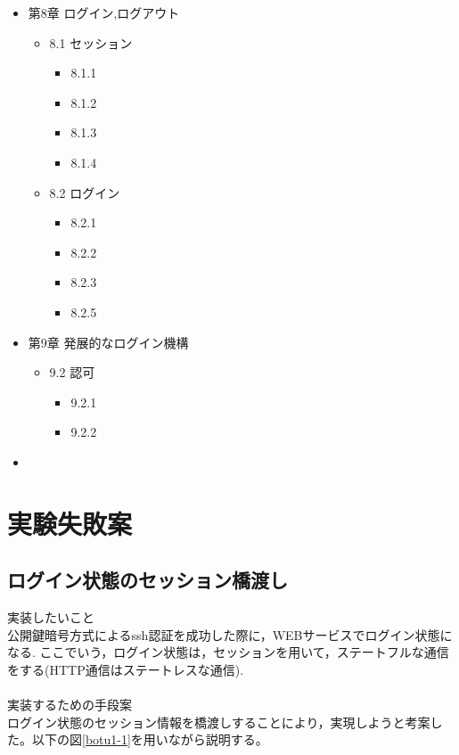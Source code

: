 \begin{itemize}
    \item 第8章 ログイン,ログアウト
    \begin{itemize}
        \item 8.1 セッション
        \begin{itemize}
            \item 8.1.1
            \item 8.1.2
            \item 8.1.3
            \item 8.1.4
        \end{itemize}
        \item 8.2 ログイン
        \begin{itemize}
            \item 8.2.1
            \item 8.2.2
            \item 8.2.3
            \item 8.2.5
        \end{itemize}
    \end{itemize}

    \item 第9章 発展的なログイン機構
    \begin{itemize}
        \item 9.2 認可
        \begin{itemize}
            \item 9.2.1
            \item 9.2.2
        \end{itemize}

    \end{itemize}


\end{itemize}

    \begin{itemize}
        \item
    \end{itemize}



\section{実験失敗案}
\subsection{ログイン状態のセッション橋渡し}
\noindent 実装したいこと\\
公開鍵暗号方式によるssh認証を成功した際に，WEBサービスでログイン状態になる.
ここでいう，ログイン状態は，セッションを用いて，ステートフルな通信をする(HTTP通信はステートレスな通信).
\\\\
\noindent 実装するための手段案\\
ログイン状態のセッション情報を橋渡しすることにより，実現しようと考案した。以下の図\ref{botu1-1}を用いながら説明する。

